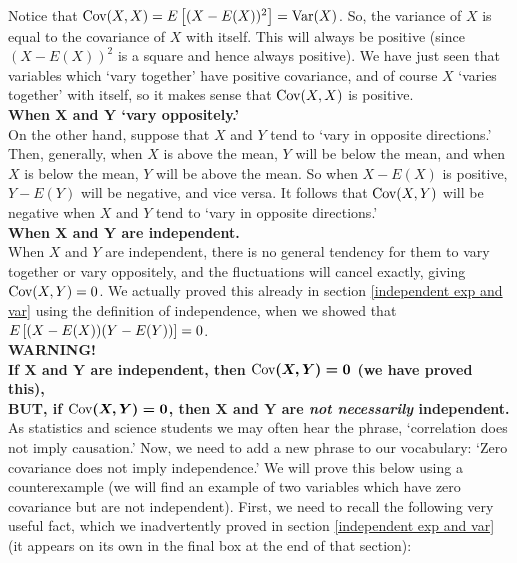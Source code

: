 \noindent Notice that $\text{Cov}(X,X) = E\left[(X - E(X))^2\right] = \text{Var}(X)$. So, the variance of $X$ is equal to the covariance of $X$ with itself. This will always be positive (since $(X - E(X))^2$ is a square and hence always positive). We have just seen that variables which `vary together' have positive covariance, and of course $X$ `varies together' with itself, so it makes sense that $\text{Cov}(X,X)$ is positive. \\

\noindent \textbf{When $\boldsymbol{X}$ and $\boldsymbol{Y}$ `vary oppositely.'} \\
\noindent On the other hand, suppose that $X$ and $Y$ tend to `vary in opposite directions.' Then, generally, when $X$ is above the mean, $Y$ will be below the mean, and when $X$ is below the mean, $Y$ will be above the mean. So when $X - E(X)$ is positive, $Y - E(Y)$ will be negative, and vice versa. It follows that $\text{Cov}(X,Y)$ will be negative when $X$ and $Y$ tend to `vary in opposite directions.' \\

\noindent  \textbf{When $\boldsymbol{X}$ and $\boldsymbol{Y}$ are independent.} \\
When $X$ and $Y$ are independent, there is no general tendency for them to vary together or vary oppositely, and the fluctuations will cancel exactly, giving $\text{Cov}(X,Y) = 0$. We actually proved this already in section \ref{independent exp and var} using the definition of independence, when we showed that $E\left[(X - E(X))(Y - E(Y))\right] = 0$. \\

\textbf{WARNING!} \\
\textbf{If $\boldsymbol{X}$ and $\boldsymbol{Y}$ are independent, then $\boldsymbol{\text{Cov}(X,Y) = 0}$ (we have proved this),} \\
\textbf{BUT, if $\boldsymbol{\text{Cov}(X,Y) = 0}$, then $\boldsymbol{X}$ and $\boldsymbol{Y}$ are \textit{not necessarily} independent.} \\

\noindent As statistics and science students we may often hear the phrase, `correlation does not imply causation.' Now, we need to add a new phrase to our vocabulary: `Zero covariance does not imply independence.' We will prove this below using a counterexample (we will find an example of two variables which have zero covariance but are not independent). First, we need to recall the following very useful fact, which we inadvertently proved in section \ref{independent exp and var} (it appears on its own in the final box at the end of that section): \label{covariance formula 2}

